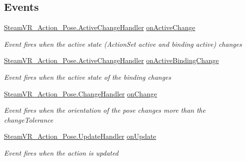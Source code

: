 \subsection*{Events}
\begin{DoxyCompactItemize}
\item 
\mbox{\hyperlink{class_valve_1_1_v_r_1_1_steam_v_r___action___pose_a3861a4b4b8ce246db2cc77e632a7f999}{Steam\+V\+R\+\_\+\+Action\+\_\+\+Pose.\+Active\+Change\+Handler}} \mbox{\hyperlink{class_valve_1_1_v_r_1_1_steam_v_r___action___pose___source_a18908de6ad641fca30dff7bdf36c44ad}{on\+Active\+Change}}
\begin{DoxyCompactList}\small\item\em Event fires when the active state (Action\+Set active and binding active) changes \end{DoxyCompactList}\item 
\mbox{\hyperlink{class_valve_1_1_v_r_1_1_steam_v_r___action___pose_a3861a4b4b8ce246db2cc77e632a7f999}{Steam\+V\+R\+\_\+\+Action\+\_\+\+Pose.\+Active\+Change\+Handler}} \mbox{\hyperlink{class_valve_1_1_v_r_1_1_steam_v_r___action___pose___source_a864a6c1c7588f9cb64cf927d0abde8d3}{on\+Active\+Binding\+Change}}
\begin{DoxyCompactList}\small\item\em Event fires when the active state of the binding changes \end{DoxyCompactList}\item 
\mbox{\hyperlink{class_valve_1_1_v_r_1_1_steam_v_r___action___pose_ac9415e6ad971e70311f59ff1bfb4ea76}{Steam\+V\+R\+\_\+\+Action\+\_\+\+Pose.\+Change\+Handler}} \mbox{\hyperlink{class_valve_1_1_v_r_1_1_steam_v_r___action___pose___source_a471cf17f964e7592d160a27b85cf5102}{on\+Change}}
\begin{DoxyCompactList}\small\item\em Event fires when the orientation of the pose changes more than the change\+Tolerance \end{DoxyCompactList}\item 
\mbox{\hyperlink{class_valve_1_1_v_r_1_1_steam_v_r___action___pose_a243e7046a430c572e5be3d1b6b322b6d}{Steam\+V\+R\+\_\+\+Action\+\_\+\+Pose.\+Update\+Handler}} \mbox{\hyperlink{class_valve_1_1_v_r_1_1_steam_v_r___action___pose___source_a0850a14fdf071a66d2c8009254d22855}{on\+Update}}
\begin{DoxyCompactList}\small\item\em Event fires when the action is updated \end{DoxyCompactList}\item 

\end{DoxyCompactItemize}
